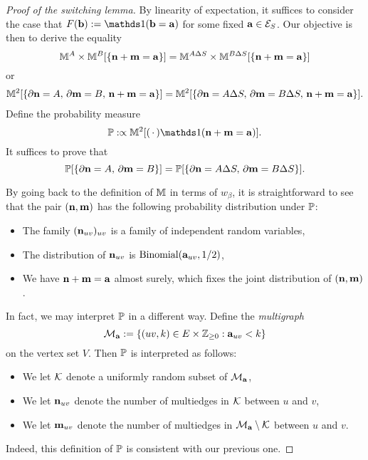 \begin{proof}[Proof of the switching lemma]
    By linearity of expectation,
    it suffices to consider the case that $F(\b):=\true{\b=\a}$
    for some fixed $\a\in\calE_S$.
    Our objective is then to derive the equality
    \[
        \M^A\times \M^B[\{\n+\m=\a\}]
        =
        \M^{A\Delta S}\times \M^{B\Delta S}[\{\n+\m=\a\}]
    \]
    or
    \begin{align}
        \M^2[\{\partial\n=A,\,\partial\m=B,\,\n+\m=\a\}]
        =
        \M^2[\{\partial\n=A\Delta S,\,\partial\m=B\Delta S,\,\n+\m=\a\}].
    \end{align}
    Define the probability measure
    \[
        \P:\propto\M^2[(\blank)\true{\n+\m=\a}].
    \]
    It suffices to prove that
    \begin{equation}
        \label{eq:switching_target_equation}
    \P[\{\partial\n=A,\,\partial\m=B\}]
    =
    \P[\{\partial\n=A\Delta S,\,\partial\m=B\Delta S\}].
    \end{equation}

    By going back to the definition of $\M$ in terms of $w_\beta$,
    it is straightforward to see that the pair $(\n,\m)$ has the following probability distribution under $\P$:
    \begin{itemize}
        \item The family $(\n_{uv})_{uv}$ is a family of independent random variables,
        \item The distribution of $\n_{uv}$ is $\operatorname{Binomial}(\a_{uv},1/2)$,
        \item We have $\n+\m=\a$ almost surely, which fixes the joint distribution of $(\n,\m)$.
    \end{itemize}
    In fact, we may interpret $\P$ in a different way.
    Define the \emph{multigraph}
    \[
        \calM_\a:=\{(uv,k)\in E\times\Z_{\geq 0}:\a_{uv}<k\}
    \]
    on the vertex set $V$.
    Then $\P$ is interpreted as follows:
    \begin{itemize}
        \item We let $\calK$ denote a uniformly random subset of $\calM_\a$,
        \item We let $\n_{uv}$ denote the number of multiedges in $\calK$ between $u$ and $v$,
        \item We let $\m_{uv}$ denote the number of multiedges in $\calM_\a\setminus\calK$ between $u$ and $v$.
    \end{itemize}
    Indeed, this definition of $\P$ is consistent with our previous one.


\end{proof}
